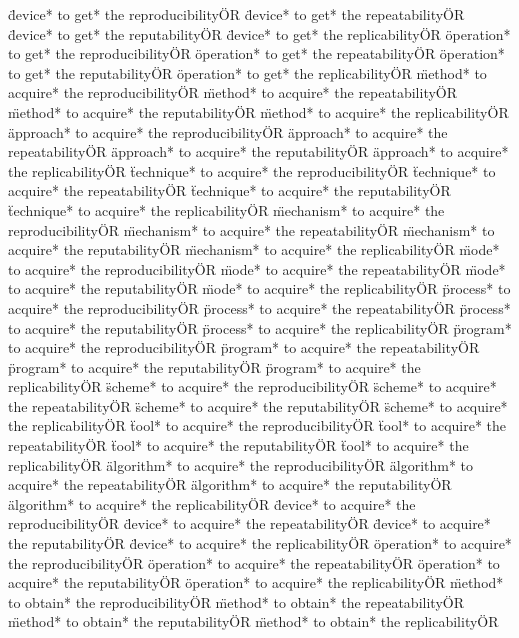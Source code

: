 \documentclass[
10pt, %
a4paper, %
oneside, %
headinclude,footinclude, %
BCOR5mm, %
]{scrartcl}
\begin{document}
\"device* to get* the reproducibility\" OR \"device* to get* the repeatability\" OR \"device* to get* the reputability\" OR \"device* to get* the replicability\" OR 
\"operation* to get* the reproducibility\" OR \"operation* to get* the repeatability\" OR \"operation* to get* the reputability\" OR \"operation* to get* the replicability\" OR 
\"method* to acquire* the reproducibility\" OR \"method* to acquire* the repeatability\" OR \"method* to acquire* the reputability\" OR \"method* to acquire* the replicability\" OR 
\"approach* to acquire* the reproducibility\" OR \"approach* to acquire* the repeatability\" OR \"approach* to acquire* the reputability\" OR \"approach* to acquire* the replicability\" OR 
\"technique* to acquire* the reproducibility\" OR \"technique* to acquire* the repeatability\" OR \"technique* to acquire* the reputability\" OR \"technique* to acquire* the replicability\" OR 
\"mechanism* to acquire* the reproducibility\" OR \"mechanism* to acquire* the repeatability\" OR \"mechanism* to acquire* the reputability\" OR \"mechanism* to acquire* the replicability\" OR 
\"mode* to acquire* the reproducibility\" OR \"mode* to acquire* the repeatability\" OR \"mode* to acquire* the reputability\" OR \"mode* to acquire* the replicability\" OR 
\"process* to acquire* the reproducibility\" OR \"process* to acquire* the repeatability\" OR \"process* to acquire* the reputability\" OR \"process* to acquire* the replicability\" OR 
\"program* to acquire* the reproducibility\" OR \"program* to acquire* the repeatability\" OR \"program* to acquire* the reputability\" OR \"program* to acquire* the replicability\" OR 
\"scheme* to acquire* the reproducibility\" OR \"scheme* to acquire* the repeatability\" OR \"scheme* to acquire* the reputability\" OR \"scheme* to acquire* the replicability\" OR 
\"tool* to acquire* the reproducibility\" OR \"tool* to acquire* the repeatability\" OR \"tool* to acquire* the reputability\" OR \"tool* to acquire* the replicability\" OR 
\"algorithm* to acquire* the reproducibility\" OR \"algorithm* to acquire* the repeatability\" OR \"algorithm* to acquire* the reputability\" OR \"algorithm* to acquire* the replicability\" OR 
\"device* to acquire* the reproducibility\" OR \"device* to acquire* the repeatability\" OR \"device* to acquire* the reputability\" OR \"device* to acquire* the replicability\" OR 
\"operation* to acquire* the reproducibility\" OR \"operation* to acquire* the repeatability\" OR \"operation* to acquire* the reputability\" OR \"operation* to acquire* the replicability\" OR 
\"method* to obtain* the reproducibility\" OR \"method* to obtain* the repeatability\" OR \"method* to obtain* the reputability\" OR \"method* to obtain* the replicability\" OR 
\end{document}
